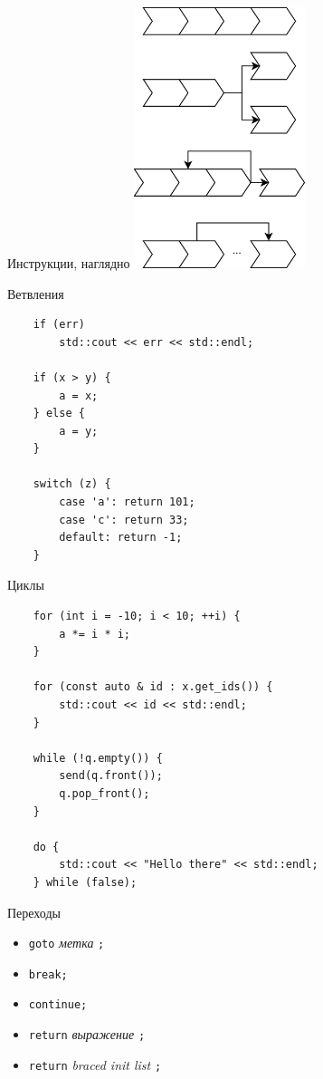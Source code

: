 \documentclass[unknownkeysallowed,xcolor=table]{beamer}
\begin{document}
\begin{frame}{Инструкции, наглядно}
  \includegraphics[align=c,width=5cm,keepaspectratio]{images/control.png}
\end{frame}

\begin{frame}[fragile]{Ветвления}
  \begin{lstlisting}
    if (err)
        std::cout << err << std::endl;

    if (x > y) {
        a = x;
    } else {
        a = y;
    }

    switch (z) {
        case 'a': return 101;
        case 'c': return 33;
        default: return -1;
    }
  \end{lstlisting}
\end{frame}

\begin{frame}[fragile]{Циклы}
  \begin{lstlisting}
    for (int i = -10; i < 10; ++i) {
        a *= i * i;
    }

    for (const auto & id : x.get_ids()) {
        std::cout << id << std::endl;
    }

    while (!q.empty()) {
        send(q.front());
        q.pop_front();
    }

    do {
        std::cout << "Hello there" << std::endl;
    } while (false);
  \end{lstlisting}
\end{frame}

\begin{frame}[fragile]{Переходы}
  \begin{itemize}
    \item \lstinline{goto} \emph{метка} \lstinline{;} \vspace{1em}
    \item \lstinline{break;} \vspace{1em}
    \item \lstinline{continue;} \vspace{1em}
    \item \lstinline{return} \emph{выражение} \lstinline{;} \vspace{1em}
    \item \lstinline{return} \emph{braced init list} \lstinline{;}
  \end{itemize}
\end{frame}
\end{document}
